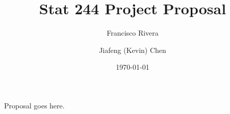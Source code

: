 \documentclass[a4paper]{article}
\begin{document}
\title{Stat 244 Project Proposal}
\author{Francisco Rivera \and Jiafeng (Kevin) Chen}
\date{\today}

\maketitle

Proposal goes here.
\end{document}
